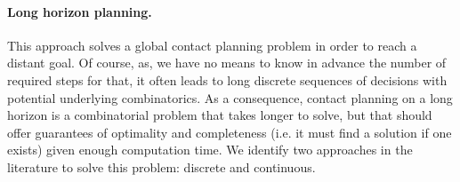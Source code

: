 \paragraph{Long horizon planning.}
This approach solves a global contact planning problem in order to reach a distant goal. 
Of course, as, we have no means to know in advance the number of required steps for that, it often leads to long discrete sequences of decisions with potential underlying combinatorics.
As a consequence, contact planning on a long horizon is a combinatorial problem that takes longer to solve, but that should offer guarantees of optimality and completeness (i.e. it must find a solution if one exists) given enough computation time.
We identify two approaches in the literature to solve this problem: discrete and continuous.

